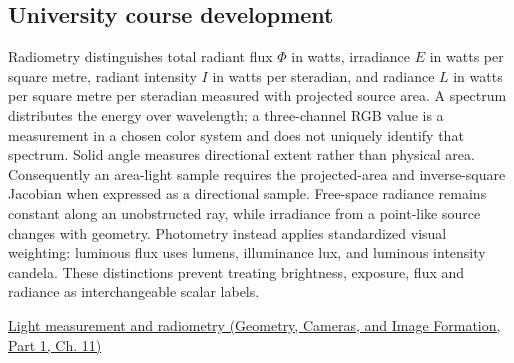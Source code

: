 \subsection{University course development}\label{appendix-215c2570199b-university-course-development}

\hypertarget{appendix-215c2570199b-university-course-development}{}

Radiometry distinguishes total radiant flux \(\Phi\) in watts, irradiance \(E\) in watts per square metre, radiant intensity \(I\) in watts per steradian, and radiance \(L\) in watts per square metre per steradian measured with projected source area. A spectrum distributes the energy over wavelength; a three-channel RGB value is a measurement in a chosen color system and does not uniquely identify that spectrum. Solid angle measures directional extent rather than physical area. Consequently an area-light sample requires the projected-area and inverse-square Jacobian when expressed as a directional sample. Free-space radiance remains constant along an unobstructed ray, while irradiance from a point-like source changes with geometry. Photometry instead applies standardized visual weighting: luminous flux uses lumens, illuminance lux, and luminous intensity candela. These distinctions prevent treating brightness, exposure, flux and radiance as interchangeable scalar labels.

\href{../03-Geometry-Cameras-and-Image-Formation-P01/main.pdf\#nameddest=03-visual-computing-i-ch004-light-measurement-and-radiometry}{Light measurement and radiometry (Geometry, Cameras, and Image Formation, Part 1, Ch. 11)}
